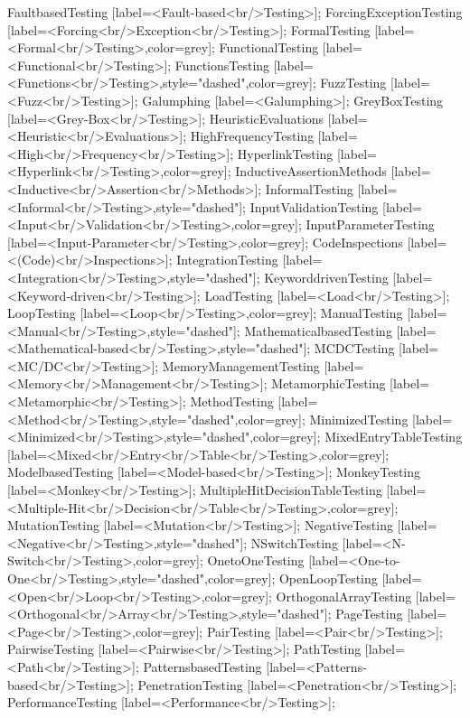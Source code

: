 \documentclass{article}
\begin{document}
{FaultbasedTesting [label=<Fault-based<br/>Testing>];
ForcingExceptionTesting [label=<Forcing<br/>Exception<br/>Testing>];
FormalTesting [label=<Formal<br/>Testing>,color=grey];
FunctionalTesting [label=<Functional<br/>Testing>];
FunctionsTesting [label=<Functions<br/>Testing>,style="dashed",color=grey];
FuzzTesting [label=<Fuzz<br/>Testing>];
Galumphing [label=<Galumphing>];
GreyBoxTesting [label=<Grey-Box<br/>Testing>];
HeuristicEvaluations [label=<Heuristic<br/>Evaluations>];
HighFrequencyTesting [label=<High<br/>Frequency<br/>Testing>];
HyperlinkTesting [label=<Hyperlink<br/>Testing>,color=grey];
InductiveAssertionMethods [label=<Inductive<br/>Assertion<br/>Methods>];
InformalTesting [label=<Informal<br/>Testing>,style="dashed"];
InputValidationTesting [label=<Input<br/>Validation<br/>Testing>,color=grey];
InputParameterTesting [label=<Input-Parameter<br/>Testing>,color=grey];
CodeInspections [label=<(Code)<br/>Inspections>];
IntegrationTesting [label=<Integration<br/>Testing>,style="dashed"];
KeyworddrivenTesting [label=<Keyword-driven<br/>Testing>];
LoadTesting [label=<Load<br/>Testing>];
LoopTesting [label=<Loop<br/>Testing>,color=grey];
ManualTesting [label=<Manual<br/>Testing>,style="dashed"];
MathematicalbasedTesting [label=<Mathematical-based<br/>Testing>,style="dashed"];
MCDCTesting [label=<MC/DC<br/>Testing>];
MemoryManagementTesting [label=<Memory<br/>Management<br/>Testing>];
MetamorphicTesting [label=<Metamorphic<br/>Testing>];
MethodTesting [label=<Method<br/>Testing>,style="dashed",color=grey];
MinimizedTesting [label=<Minimized<br/>Testing>,style="dashed",color=grey];
MixedEntryTableTesting [label=<Mixed<br/>Entry<br/>Table<br/>Testing>,color=grey];
ModelbasedTesting [label=<Model-based<br/>Testing>];
MonkeyTesting [label=<Monkey<br/>Testing>];
MultipleHitDecisionTableTesting [label=<Multiple-Hit<br/>Decision<br/>Table<br/>Testing>,color=grey];
MutationTesting [label=<Mutation<br/>Testing>];
NegativeTesting [label=<Negative<br/>Testing>,style="dashed"];
NSwitchTesting [label=<N-Switch<br/>Testing>,color=grey];
OnetoOneTesting [label=<One-to-One<br/>Testing>,style="dashed",color=grey];
OpenLoopTesting [label=<Open<br/>Loop<br/>Testing>,color=grey];
OrthogonalArrayTesting [label=<Orthogonal<br/>Array<br/>Testing>,style="dashed"];
PageTesting [label=<Page<br/>Testing>,color=grey];
PairTesting [label=<Pair<br/>Testing>];
PairwiseTesting [label=<Pairwise<br/>Testing>];
PathTesting [label=<Path<br/>Testing>];
PatternsbasedTesting [label=<Patterns-based<br/>Testing>];
PenetrationTesting [label=<Penetration<br/>Testing>];
PerformanceTesting [label=<Performance<br/>Testing>];
}
\end{document}
